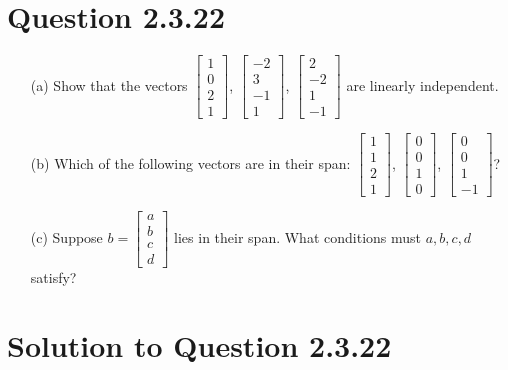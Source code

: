 \documentclass[12pt]{article}
\begin{document}
\section*{Question 2.3.22}
\begin{itemize}
    \item[(a)] Show that the vectors \(\begin{bmatrix} 1 \\ 0 \\ 2 \\ 1 \end{bmatrix}\), \(\begin{bmatrix} -2 \\ 3 \\ -1 \\ 1 \end{bmatrix}\), \(\begin{bmatrix} 2 \\ -2 \\ 1 \\ -1 \end{bmatrix}\) are linearly independent.
    \item[(b)] Which of the following vectors are in their span: \(\begin{bmatrix} 1 \\ 1 \\ 2 \\ 1 \end{bmatrix}\), \(\begin{bmatrix} 0 \\ 0 \\ 1 \\ 0 \end{bmatrix}\), \(\begin{bmatrix} 0 \\ 0 \\ 1 \\ -1 \end{bmatrix}\)?
    \item[(c)] Suppose \(b = \begin{bmatrix} a \\ b \\ c \\ d \end{bmatrix}\) lies in their span. What conditions must \(a, b, c, d\) satisfy?
\end{itemize}

\section*{Solution to Question 2.3.22}
\end{document}
